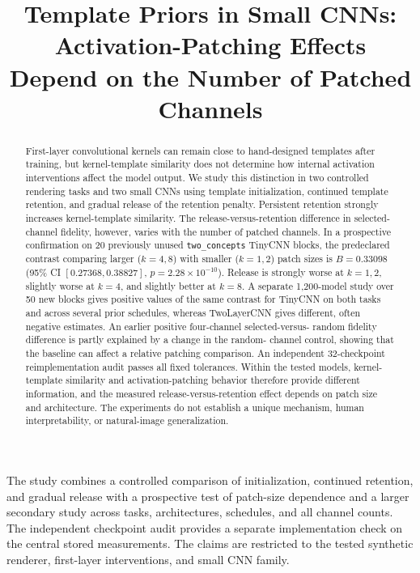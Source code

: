 
\title{Template Priors in Small CNNs: Activation-Patching Effects Depend on the Number of Patched Channels}

\begin{abstract}
First-layer convolutional kernels can remain close to hand-designed templates
after training, but kernel-template similarity does not determine how internal
activation interventions affect the model output. We study this distinction in
two controlled rendering tasks and two small CNNs using template
initialization, continued template retention, and gradual release of the
retention penalty. Persistent retention strongly increases kernel-template
similarity. The release-versus-retention difference in selected-channel
fidelity, however, varies with the number of patched channels. In a prospective
confirmation on 20 previously unused \texttt{two\_concepts} TinyCNN blocks,
the predeclared contrast comparing larger ($k=4,8$) with smaller ($k=1,2$)
patch sizes is $B=0.33098$ (95\% CI $[0.27368,0.38827]$,
$p=2.28\times10^{-10}$). Release is strongly worse at $k=1,2$, slightly worse
at $k=4$, and slightly better at $k=8$. A separate 1,200-model study over 50
new blocks gives positive values of the same contrast for TinyCNN on both
tasks and across several prior schedules, whereas TwoLayerCNN gives different,
often negative estimates. An earlier positive four-channel selected-versus-
random fidelity difference is partly explained by a change in the random-
channel control, showing that the baseline can affect a relative patching
comparison. An independent 32-checkpoint reimplementation audit passes all
fixed tolerances. Within the tested models, kernel-template similarity and
activation-patching behavior therefore provide different information, and the
measured release-versus-retention effect depends on patch size and architecture.
The experiments do not establish a unique mechanism, human interpretability,
or natural-image generalization.
\end{abstract}

The study combines a controlled comparison of initialization, continued
retention, and gradual release with a prospective test of patch-size dependence
and a larger secondary study across tasks, architectures, schedules, and all
channel counts. The independent checkpoint audit provides a separate
implementation check on the central stored measurements. The claims are
restricted to the tested synthetic renderer, first-layer interventions, and
small CNN family.
